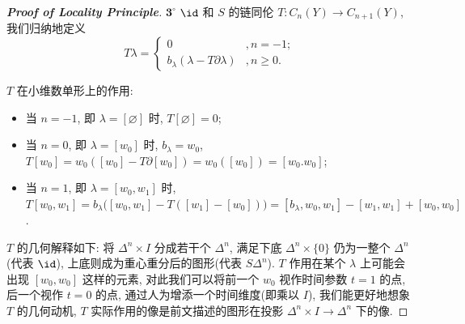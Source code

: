 \begin{proof}[{\bf Proof of Locality Principle}]
            \noindent$\mathbf{3}^{\circ}$ $\id$ 和 $S$ 的链同伦 $T:C_n(Y)\rightarrow C_{n+1}(Y)$, 我们归纳地定义
            \begin{equation*}
                T\lambda = 
                \begin{cases}
                    0 &, n = -1; \\
                    b_{\lambda}(\lambda-T\partial\lambda) &, n\geq0.
                \end{cases}
            \end{equation*}
            \begin{center}
            \end{center}
            $T$ 在小维数单形上的作用:
            \begin{itemize}
                \item  当 $n=-1$, 即 $\lambda=[\varnothing]$ 时, $T[\varnothing] = 0$; 
                \item 当 $n=0$, 即 $\lambda=[w_0]$ 时, $b_\lambda=w_0$, $T[w_0] = w_0([w_0]-T\partial[w_0]) = w_0([w_0]) = [w_0.w_0]$;
                \item  当 $n=1$, 即 $\lambda=[w_0,w_1]$ 时, $T[w_0,w_1] = b_{\lambda}\Big([w_0,w_1]-T([w_1]-[w_0])\Big) = [b_{\lambda},w_0,w_1]-[w_1,w_1]+[w_0,w_0]$.
            \end{itemize}
            $T$ 的几何解释如下: 将 $\Delta^n\times I$ 分成若干个 $\Delta^n$, 满足下底 $\Delta^n\times\{0\}$ 仍为一整个 $\Delta^n$(代表 $\id$), 
            上底则成为重心重分后的图形(代表 $S\Delta^n$). $T$ 作用在某个 $\lambda$ 上可能会出现 $[w_0,w_0]$ 这样的元素, 
            对此我们可以将前一个 $w_0$ 视作时间参数 $t=1$ 的点, 后一个视作 $t=0$ 的点, 通过人为增添一个时间维度(即乘以 $I$), 我们能更好地想象 $T$ 的几何动机, 
            $T$ 实际作用的像是前文描述的图形在投影 $\Delta^n\times I\rightarrow\Delta^n$ 下的像.

\end{proof}
